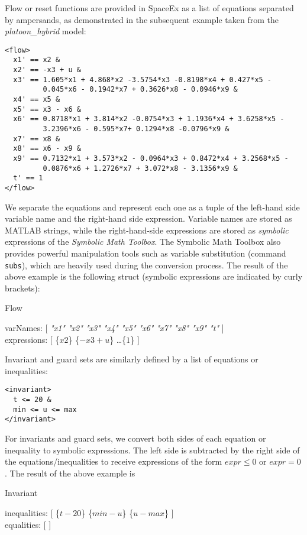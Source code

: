 Flow or reset functions are provided in SpaceEx as a list of equations separated by ampersands, as demonstrated in the subsequent example taken from the \textit{platoon\_hybrid} model:
\begin{lstlisting}
<flow>
  x1' == x2 &
  x2' == -x3 + u &
  x3' == 1.605*x1 + 4.868*x2 -3.5754*x3 -0.8198*x4 + 0.427*x5 - 
         0.045*x6 - 0.1942*x7 + 0.3626*x8 - 0.0946*x9 &
  x4' == x5 &
  x5' == x3 - x6 &
  x6' == 0.8718*x1 + 3.814*x2 -0.0754*x3 + 1.1936*x4 + 3.6258*x5 - 
         3.2396*x6 - 0.595*x7+ 0.1294*x8 -0.0796*x9 &
  x7' == x8 &
  x8' == x6 - x9 &
  x9' == 0.7132*x1 + 3.573*x2 - 0.0964*x3 + 0.8472*x4 + 3.2568*x5 - 
         0.0876*x6 + 1.2726*x7 + 3.072*x8 - 3.1356*x9 &
  t' == 1
</flow>
\end{lstlisting}
We separate the equations and represent each one as a tuple of the left-hand side variable name and the right-hand side expression. Variable names are stored as MATLAB strings, while the right-hand-side expressions are stored as \textit{symbolic} expressions of the \textit{Symbolic Math Toolbox}. The Symbolic Math Toolbox also provides powerful manipulation tools such as variable substitution (command \texttt{subs}), which are heavily used during the conversion process. The result of the above example is the following struct (symbolic expressions are indicated by curly brackets):
\begin{nestedlist}
  Flow
  \begin{nestedlist}
    varNames: [ \textit{"x1" "x2" "x3" "x4" "x5" "x6" "x7" "x8" "x9" "t"} ] \\
    expressions: [ \{$x2$\} \{$-x3 + u$\} \dots \{$1$\} ]
  \end{nestedlist}
\end{nestedlist}
Invariant and guard sets are similarly defined by a list of equations or inequalities:
\begin{lstlisting}
<invariant>
  t <= 20 &
  min <= u <= max
</invariant>
\end{lstlisting}
For invariants and guard sets, we convert both sides of each equation or inequality to symbolic expressions. The left side is subtracted by the right side of the equations/inequalities to receive expressions of the form $expr \leq 0$ or $expr = 0$.
The result of the above example is
\begin{nestedlist}
  Invariant
  \begin{nestedlist}
    inequalities: [ \{$t - 20$\} \{$min - u$\} \{$u - max$\} ] \\
    equalities: [ ]
  \end{nestedlist}
\end{nestedlist}

